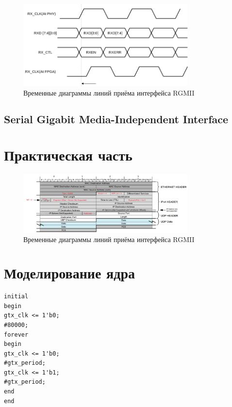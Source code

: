 \begin{figure}[!ht]
	\centering
	\includegraphics[width=0.8\textwidth]{image/RX_RGMII}
	\caption{Временные диаграммы линий приёма интерфейса RGMII}
	\label{TX_RGMII}
\end{figure}

\subsection{Serial Gigabit Media-Independent Interface}

\section{Практическая часть}

\begin{figure}[!ht]
	\centering
	\includegraphics[width=0.8\textwidth]{image/eth_subsystem_frame.png}
	\caption{Временные диаграммы линий приёма интерфейса RGMII}
	\label{TX_RGMII}
\end{figure}

\section{Моделирование ядра}

\begin{Verbatim}[tabsize=4]
initial
begin
gtx_clk <= 1'b0;
#80000;
forever
begin
gtx_clk <= 1'b0;
#gtx_period;
gtx_clk <= 1'b1;
#gtx_period;
end
end
\end{Verbatim}

